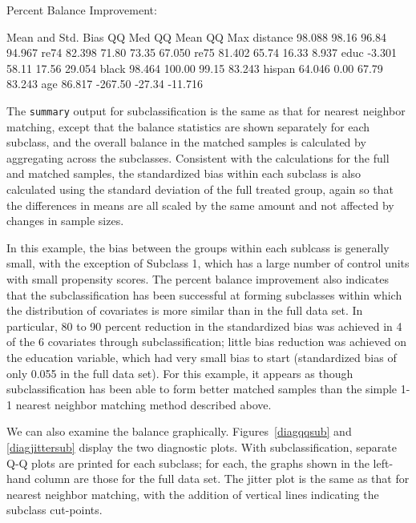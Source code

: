 \documentclass[oneside,letterpaper,titlepage]{article}
\begin{document}
\begin{enumerate}
\begin{Schunk}
\begin{Soutput}
Percent Balance Improvement:

         Mean and Std. Bias  QQ Med QQ Mean  QQ Max
distance             98.088   98.16   96.84  94.967
re74                 82.398   71.80   73.35  67.050
re75                 81.402   65.74   16.33   8.937
educ                 -3.301   58.11   17.56  29.054
black                98.464  100.00   99.15  83.243
hispan               64.046    0.00   67.79  83.243
age                  86.817 -267.50  -27.34 -11.716
\end{Soutput}
\end{Schunk}

The \texttt{summary} output for subclassification is the same as that for nearest neighbor matching, except
that the balance statistics are shown separately for each subclass, and the overall balance in the matched samples
is calculated by aggregating across the subclasses.  Consistent with the calculations for the full and matched samples,
the standardized bias within each subclass is also calculated using the standard deviation of the full treated group, 
again so that the differences in means are all scaled by the same amount and not affected by changes in sample sizes.   

In this example, the bias between the groups 
within each sublcass is generally small, with the exception of Subclass 1, which has a large number of control units 
with small propensity scores.  
The percent balance improvement also indicates that the subclassification has been successful at forming subclasses within 
which the distribution of covariates is more similar than in the full data set.  In particular, 80 to 90 percent reduction in 
the standardized bias was achieved in 4 of the 6 covariates through subclassification; little bias reduction was achieved on 
the education variable, which had very small bias to start (standardized bias of only 0.055 in the full data set).  For this
example, it appears as though subclassification has been able to form better matched samples than the simple 1-1 nearest 
neighbor matching method described above.

We can also examine the balance graphically.  Figures~\ref{diagqqsub} and \ref{diagjittersub} display the two
diagnostic plots.  With subclassification, separate Q-Q plots are printed for each subclass; for each, the graphs
shown in the left-hand column are those for the full data set.  The jitter plot is the same as that for nearest neighbor 
matching, with the addition of vertical lines indicating the subclass cut-points.


\end{enumerate}
\end{document}
